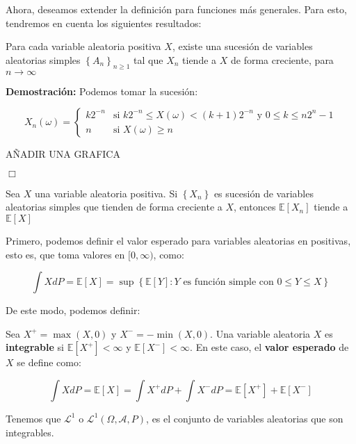 Ahora, deseamos extender la definición para funciones más generales. Para esto, tendremos en cuenta los siguientes resultados:

\begin{theorem}
	Para cada variable aleatoria positiva $X$, existe una sucesión de variables aleatorias simples $\left\{ A_n \right\}_{n \geq 1}$ tal que $X_n$ tiende a $X$ de forma creciente, para $n \rightarrow \infty$ 
\end{theorem}

\textbf{Demostración:} Podemos tomar la sucesión:

\[
	X_n (\omega) = \left\{ \begin{matrix}
		k 2^{-n} & \text{si } k 2^{-n} \leq X(\omega) < (k+1) 2^{-n} \text{ y } 0 \leq k \leq n 2^n - 1 \\
		n & \text{si } X(\omega) \geq n
	\end{matrix}
	 \right.
\]

AÑADIR UNA GRAFICA

\begin{flushright}
	$\Box$
\end{flushright}


\begin{theorem}
	Sea $X$ una variable aleatoria positiva. Si $\left\{ X_n \right\}$ es sucesión de variables aleatorias simples que tienden de forma creciente a $X$, entonces $\mathbb{E}[X_n]$ tiende a $\mathbb{E}[X]$
\end{theorem}

Primero, podemos definir el valor esperado para variables aleatorias en positivas, esto es, que toma valores en $[0, \infty )$, como:

\[
	\int X dP = \mathbb{E}[X] = \sup \left\{ \mathbb{E}[Y] : Y \text{ es función simple con } 0 \leq Y \leq X \right\}
\]

De este modo, podemos definir:

\begin{boxDef}
	Sea $X^+ = \max (X, 0)$ y $X^- = -\min (X, 0)$. Una variable aleatoria $X$ es \textbf{integrable} si $\mathbb{E}[X^+] < \infty$ y $\mathbb{E}[X^-] < \infty$. En este caso, el \textbf{valor esperado} de $X$ se define como:

	\[
		\int X dP = \mathbb{E}[X] = \int X^+ dP + \int X^- dP = \mathbb{E}[X^+] + \mathbb{E}[X^-]
	\] 

	Tenemos que $\mathcal{L}^1$ o $\mathcal{L}^1 (\Omega, \mathcal{A}, P)$, es el conjunto de variables aleatorias que son integrables. \\ 


\end{boxDef}

